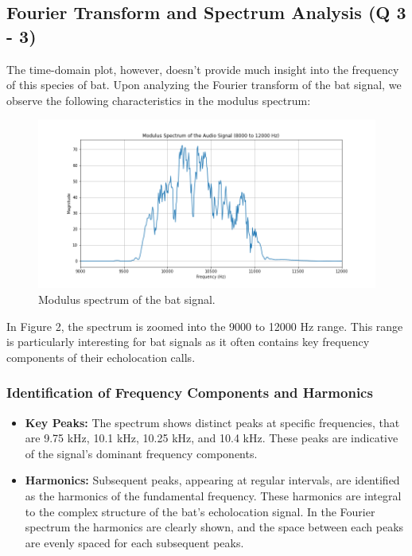 \documentclass[12pt]{article}
\begin{document}
\subsection{Fourier Transform and Spectrum Analysis (Q 3 - 3)}
The time-domain plot, however, doesn't provide much insight into the frequency of this species of bat. Upon analyzing the Fourier transform of the bat signal, we observe the following characteristics in the modulus spectrum:

\begin{figure}[h]
\centering
\includegraphics[width=1\textwidth]{modulus_spectrum.png}
\caption{Modulus spectrum of the bat signal.}
\end{figure}

In Figure 2, the spectrum is zoomed into the 9000 to 12000 Hz range. This range is particularly interesting for bat signals as it often contains key frequency components of their echolocation calls.

\subsubsection*{Identification of Frequency Components and Harmonics}
\begin{itemize}
    \item \textbf{Key Peaks:} The spectrum shows distinct peaks at specific frequencies, that are 9.75 kHz, 10.1 kHz, 10.25 kHz, and 10.4 kHz. These peaks are indicative of the signal's dominant frequency components.
        
    \item \textbf{Harmonics:} Subsequent peaks, appearing at regular intervals, are identified as the harmonics of the fundamental frequency. These harmonics are integral to the complex structure of the bat's echolocation signal. In the Fourier spectrum the harmonics are clearly shown, and the space between each peaks are evenly spaced for each subsequent peaks.
\end{itemize}
\end{document}
